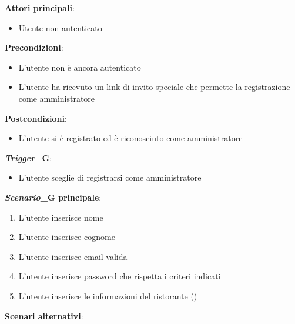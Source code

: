 \textbf{Attori principali}: 
\begin{itemize}
    \item Utente non autenticato
\end{itemize}
\textbf{Precondizioni}:
\begin{itemize}
    \item L'utente non è ancora autenticato
    \item L'utente ha ricevuto un link di invito speciale che permette la registrazione come amministratore
\end{itemize}
\textbf{Postcondizioni}: 
\begin{itemize}
    \item L'utente si è registrato ed è riconosciuto come amministratore
\end{itemize}
\textbf{\textit{Trigger}_G}:
\begin{itemize}
    \item L'utente sceglie di registrarsi come amministratore
\end{itemize}
\textbf{\textit{Scenario}_G principale}:
\begin{enumerate}
    \item L'utente inserisce nome
    \item L'utente inserisce cognome
    \item L'utente inserisce email valida
    \item L'utente inserisce password che rispetta i criteri indicati
    \item L'utente inserisce le informazioni del ristorante ()
\end{enumerate}
\textbf{Scenari alternativi}:

